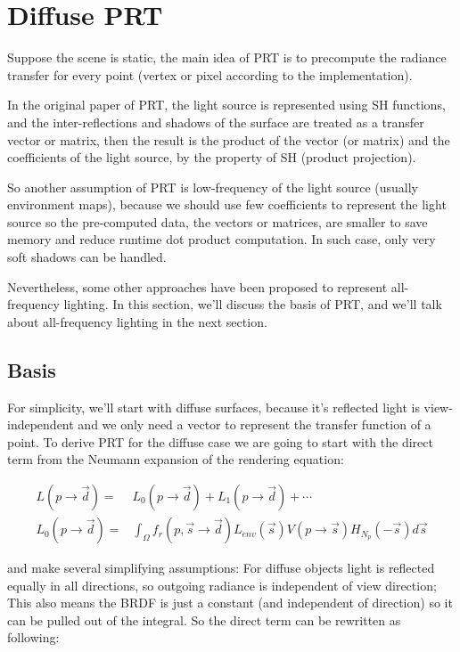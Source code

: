 \section{Diffuse PRT}\label{sec:prt}
Suppose the scene is static, the main idea of PRT is to precompute the radiance transfer for every point (vertex or pixel according to the implementation).

In the original paper of PRT\cite{a:PrecomputedRadianceTransferforRealTimeRenderinginDynamicLowFrequencyLightingEnvironments}, the light source is represented using SH functions, and the inter-reflections and shadows of the surface are treated as a transfer vector or matrix, then the result is the product of the vector (or matrix) and the coefficients of the light source, by the property of SH (product projection).

So another assumption of PRT is low-frequency of the light source (usually environment maps), because we should use few coefficients to represent the light source so the pre-computed data, the vectors or matrices, are smaller to save memory and reduce runtime dot product computation. In such case, only very soft shadows can be handled.

Nevertheless, some other approaches have been proposed to represent all-frequency lighting. In this section, we'll discuss the basis of PRT, and we'll talk about all-frequency lighting in the next section.



\subsection{Basis}
For simplicity, we'll start with diffuse surfaces, because it's reflected light is view-independent and we only need a vector to represent the transfer function of a point. To derive PRT for the diffuse case we are going to start with the direct term from the Neumann expansion of the rendering equation:

\begin{equation*}
\begin{aligned}
	L(p\to\vec{d})=&L_0(p\to\vec{d})+L_1(p\to\vec{d})+\cdots \\
	L_0(p\to\vec{d})=&\int_\Omega f_r(p,\vec{s}\to\vec{d})L_{env}(\vec{s})V(p\to\vec{s})H_{N_p}(-\vec{s})d\vec{s}
\end{aligned}
\end{equation*}

and make several simplifying assumptions: For diffuse objects light is reflected equally in all directions, so outgoing radiance is independent of view direction; This also means the BRDF is just a constant (and independent of direction) so it can be pulled out of the integral. So the direct term can be rewritten as following:

